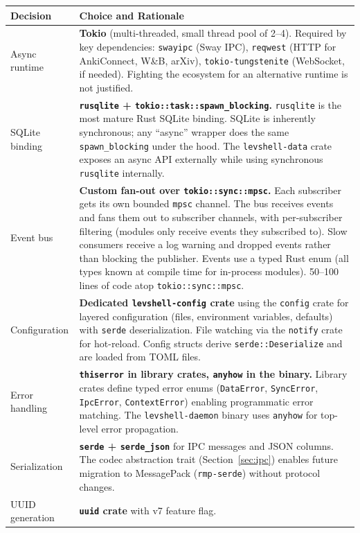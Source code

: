 \documentclass[11pt,a4paper]{article}
\begin{document}
\begin{longtable}{p{4.5cm} p{9cm}}
\toprule
\textbf{Decision} & \textbf{Choice and Rationale} \\
\midrule
Async runtime & \textbf{Tokio} (multi-threaded, small thread pool of 2--4). Required by key dependencies: \texttt{swayipc} (Sway IPC), \texttt{reqwest} (HTTP for AnkiConnect, W\&B, arXiv), \texttt{tokio-tungstenite} (WebSocket, if needed). Fighting the ecosystem for an alternative runtime is not justified. \\
\addlinespace
SQLite binding & \textbf{\texttt{rusqlite} + \texttt{tokio::task::spawn\_blocking}.} \texttt{rusqlite} is the most mature Rust SQLite binding. SQLite is inherently synchronous; any ``async'' wrapper does the same \texttt{spawn\_blocking} under the hood. The \texttt{levshell-data} crate exposes an async API externally while using synchronous \texttt{rusqlite} internally. \\
\addlinespace
Event bus & \textbf{Custom fan-out over \texttt{tokio::sync::mpsc}.} Each subscriber gets its own bounded \texttt{mpsc} channel. The bus receives events and fans them out to subscriber channels, with per-subscriber filtering (modules only receive events they subscribed to). Slow consumers receive a log warning and dropped events rather than blocking the publisher. Events use a typed Rust enum (all types known at compile time for in-process modules). 50--100 lines of code atop \texttt{tokio::sync::mpsc}. \\
\addlinespace
Configuration & \textbf{Dedicated \texttt{levshell-config} crate} using the \texttt{config} crate for layered configuration (files, environment variables, defaults) with \texttt{serde} deserialization. File watching via the \texttt{notify} crate for hot-reload. Config structs derive \texttt{serde::Deserialize} and are loaded from TOML files. \\
\addlinespace
Error handling & \textbf{\texttt{thiserror} in library crates, \texttt{anyhow} in the binary.} Library crates define typed error enums (\texttt{DataError}, \texttt{SyncError}, \texttt{IpcError}, \texttt{ContextError}) enabling programmatic error matching. The \texttt{levshell-daemon} binary uses \texttt{anyhow} for top-level error propagation. \\
\addlinespace
Serialization & \textbf{\texttt{serde} + \texttt{serde\_json}} for IPC messages and JSON columns. The codec abstraction trait (Section~\ref{sec:ipc}) enables future migration to MessagePack (\texttt{rmp-serde}) without protocol changes. \\
\addlinespace
UUID generation & \textbf{\texttt{uuid} crate} with v7 feature flag. \\
\bottomrule
\end{longtable}
\end{document}
